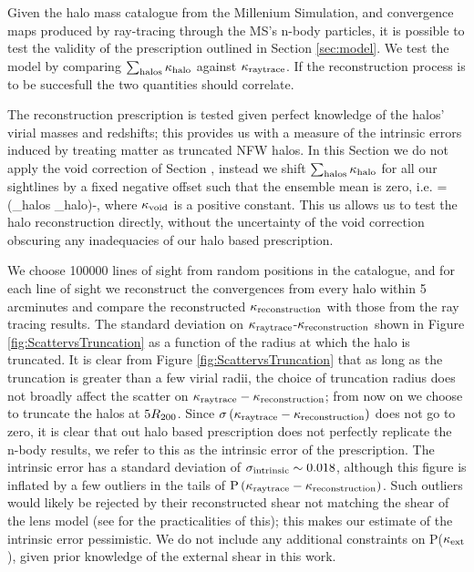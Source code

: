 \documentclass[useAMS,usenatbib]{mn2e}
\begin{document}
Given the halo mass catalogue from the Millenium Simulation, and convergence maps produced by
ray-tracing through the MS's n-body particles, 
it is possible to test the validity of the prescription outlined in Section \ref{sec:model}. We test the model
 by comparing $\sum_{\rm halos} \kappa_{\rm halo}$ against $\kappa_{\rm raytrace}$. If the reconstruction process is to be
 succesfull the two quantities should correlate.

The reconstruction prescription is tested given perfect
knowledge of the halos' virial masses and redshifts; this provides us with a measure of the intrinsic
errors induced by treating matter as truncated NFW halos. In this Section we do not apply the void correction of
Section \label{subsec:voids}, instead we shift $\sum_{\rm halos} \kappa_{\rm halo}$ for all our sightlines by a fixed negative offset such that the ensemble mean
is zero, i.e.
\be \label{eq:totalkappax}
\kapparec = \left(\sum_{\rm halos} \kappa_{\rm halo}\right)-\kappav,
\ee
where $\kappa_{\rm void}$ is a positive constant. This us allows us to test the halo reconstruction directly, without the uncertainty of the void correction
obscuring any inadequacies of our halo based prescription.

We choose 100000 lines of sight from random positions in the catalogue, and for each line of sight we reconstruct the
convergences from every halo within 5 arcminutes and compare the reconstructed
$\kappa_{\rm reconstruction}$ with those from the ray tracing results. The standard deviation on $\kappa_{\rm raytrace}$-$\kappa_{\rm reconstruction}$ 
shown in Figure \ref{fig:ScattervsTruncation} as a function of the radius at which the halo is truncated.
 It is clear from Figure \ref{fig:ScattervsTruncation} 
that as long as the truncation is greater than a few virial radii, the choice of truncation
radius does not broadly affect the scatter on $\kappa_{\rm raytrace}-\kappa_{\rm reconstruction}$; from now on we choose 
to truncate the halos at $5 R_{200}$. Since $\sigma\left(\kappa_{\rm raytrace}-\kappa_{\rm reconstruction}\right)$ does not go to
zero, it is clear that out halo based prescription does not perfectly replicate the n-body results, we refer to this
 as the intrinsic error of the prescription.
 The intrinsic error has a standard deviation of $\sigma_{\rm intrinsic} \sim 0.018$, although
this figure is inflated by a few outliers in the tails of ${\rm P}\left(\kappa_{\rm raytrace}-\kappa_{\rm reconstruction}\right)$. Such outliers would 
likely be rejected by their reconstructed shear not matching the shear of the lens model 
(see \citet{Wong} for the practicalities of this);
 this makes our estimate of the intrinsic error pessimistic. We do not include any additional constraints on P($\kappa_{\rm ext}$), given prior knowledge of the external shear in this work.
\end{document}
